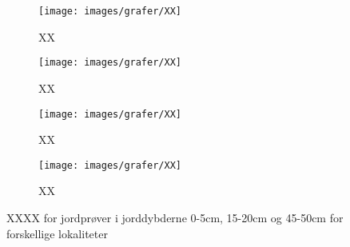 \begin{figure}[H]
    \begin{subfigure}[b]{0.5\textwidth}
        \centering
        \texttt{[image: images/grafer/XX]}
        \caption{XX}
        \label{XX}
    \end{subfigure}
    \begin{subfigure}[b]{0.5\textwidth}
        \centering
        \texttt{[image: images/grafer/XX]}
        \caption{XX}
        \label{XX}
    \end{subfigure}
    \vspace{0.2cm}
    \begin{subfigure}[b]{0.5\textwidth}
        \centering
        \texttt{[image: images/grafer/XX]}
        \caption{XX}
        \label{XX}
    \end{subfigure}
    \begin{subfigure}[b]{0.5\textwidth}
        \centering
        \texttt{[image: images/grafer/XX]}
        \caption{XX}
        \label{XX}
    \end{subfigure}
    \caption{XXXX for jordprøver i jorddybderne 0-5cm, 15-20cm og 45-50cm for forskellige lokaliteter}
    \label{fig:XX}
\end{figure}
